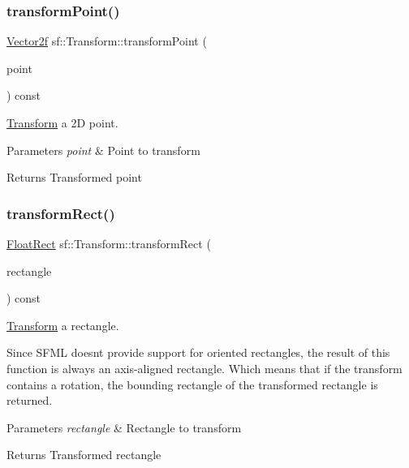 \subsubsection{\texorpdfstring{transform\+Point()}{transformPoint()}\hspace{0.1cm}{\footnotesize\ttfamily [2/2]}}
{\footnotesize\ttfamily \hyperlink{classsf_1_1_vector2}{Vector2f} sf\+::\+Transform\+::transform\+Point (\begin{DoxyParamCaption}\item[{const \hyperlink{classsf_1_1_vector2}{Vector2f} \&}]{point }\end{DoxyParamCaption}) const}



\hyperlink{classsf_1_1_transform}{Transform} a 2D point. 


\begin{DoxyParams}{Parameters}
{\em point} & Point to transform\\
\hline
\end{DoxyParams}
\begin{DoxyReturn}{Returns}
Transformed point 
\end{DoxyReturn}
\mbox{\label{classsf_1_1_transform_a3824a20505d81a94bc22be1ffee57d3d}} 
\subsubsection{\texorpdfstring{transform\+Rect()}{transformRect()}}
{\footnotesize\ttfamily \hyperlink{classsf_1_1_rect}{Float\+Rect} sf\+::\+Transform\+::transform\+Rect (\begin{DoxyParamCaption}\item[{const \hyperlink{classsf_1_1_rect}{Float\+Rect} \&}]{rectangle }\end{DoxyParamCaption}) const}



\hyperlink{classsf_1_1_transform}{Transform} a rectangle. 

Since S\+F\+ML doesn\textquotesingle{}t provide support for oriented rectangles, the result of this function is always an axis-\/aligned rectangle. Which means that if the transform contains a rotation, the bounding rectangle of the transformed rectangle is returned.


\begin{DoxyParams}{Parameters}
{\em rectangle} & Rectangle to transform\\
\hline
\end{DoxyParams}
\begin{DoxyReturn}{Returns}
Transformed rectangle 
\end{DoxyReturn}
\mbox{\label{classsf_1_1_transform_ab54f6c8070cc05e2afcb3145fbf4395a}} 
